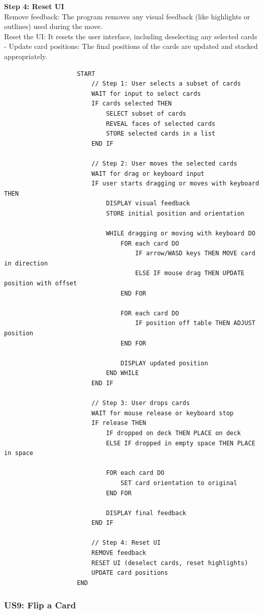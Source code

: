 \documentclass[a4paper]{project}
\begin{document}
				\textbf{Step 4: Reset UI} \\
				Remove feedback: The program removes any visual feedback (like highlights or outlines) used during the move. \\
				Reset the UI: It resets the user interface, including deselecting any selected cards - Update card positions: The final positions of the cards are updated and stacked appropriately.
				
				\clearpage
				
				\begin{lstlisting}
					START
						// Step 1: User selects a subset of cards
						WAIT for input to select cards
						IF cards selected THEN
							SELECT subset of cards
							REVEAL faces of selected cards
							STORE selected cards in a list
						END IF 
						
						// Step 2: User moves the selected cards
						WAIT for drag or keyboard input
						IF user starts dragging or moves with keyboard THEN
							DISPLAY visual feedback
							STORE initial position and orientation
						
							WHILE dragging or moving with keyboard DO
								FOR each card DO
									IF arrow/WASD keys THEN MOVE card in direction
									ELSE IF mouse drag THEN UPDATE position with offset
								END FOR
							
								FOR each card DO
									IF position off table THEN ADJUST position
								END FOR
							
								DISPLAY updated position
							END WHILE
						END IF
						
						// Step 3: User drops cards
						WAIT for mouse release or keyboard stop
						IF release THEN
							IF dropped on deck THEN PLACE on deck
							ELSE IF dropped in empty space THEN PLACE in space
					
							FOR each card DO
								SET card orientation to original
							END FOR
					
							DISPLAY final feedback
						END IF
						
						// Step 4: Reset UI
						REMOVE feedback
						RESET UI (deselect cards, reset highlights)
						UPDATE card positions
					END
				\end{lstlisting}
				
				
				\clearpage
			
			\subsubsection*{US9: Flip a Card}\label{subsubsec:us9-flip-a-card}
			
\end{document}
